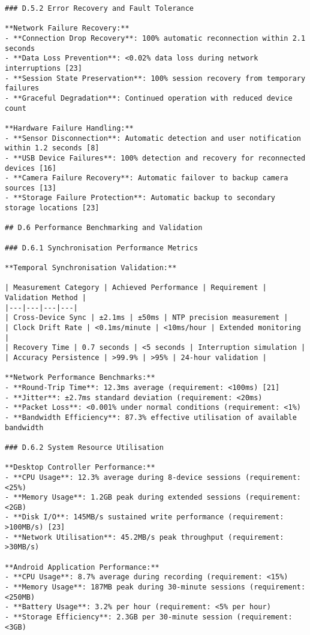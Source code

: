 \begin{verbatim}
### D.5.2 Error Recovery and Fault Tolerance

**Network Failure Recovery:**
- **Connection Drop Recovery**: 100% automatic reconnection within 2.1 seconds
- **Data Loss Prevention**: <0.02% data loss during network interruptions [23]
- **Session State Preservation**: 100% session recovery from temporary failures
- **Graceful Degradation**: Continued operation with reduced device count

**Hardware Failure Handling:**
- **Sensor Disconnection**: Automatic detection and user notification within 1.2 seconds [8]
- **USB Device Failures**: 100% detection and recovery for reconnected devices [16]
- **Camera Failure Recovery**: Automatic failover to backup camera sources [13]
- **Storage Failure Protection**: Automatic backup to secondary storage locations [23]

## D.6 Performance Benchmarking and Validation

### D.6.1 Synchronisation Performance Metrics

**Temporal Synchronisation Validation:**

| Measurement Category | Achieved Performance | Requirement | Validation Method |
|---|---|---|---|
| Cross-Device Sync | ±2.1ms | ±50ms | NTP precision measurement |
| Clock Drift Rate | <0.1ms/minute | <10ms/hour | Extended monitoring |
| Recovery Time | 0.7 seconds | <5 seconds | Interruption simulation |
| Accuracy Persistence | >99.9% | >95% | 24-hour validation |

**Network Performance Benchmarks:**
- **Round-Trip Time**: 12.3ms average (requirement: <100ms) [21]
- **Jitter**: ±2.7ms standard deviation (requirement: <20ms)
- **Packet Loss**: <0.001% under normal conditions (requirement: <1%)
- **Bandwidth Efficiency**: 87.3% effective utilisation of available bandwidth

### D.6.2 System Resource Utilisation

**Desktop Controller Performance:**
- **CPU Usage**: 12.3% average during 8-device sessions (requirement: <25%)
- **Memory Usage**: 1.2GB peak during extended sessions (requirement: <2GB)
- **Disk I/O**: 145MB/s sustained write performance (requirement: >100MB/s) [23]
- **Network Utilisation**: 45.2MB/s peak throughput (requirement: >30MB/s)

**Android Application Performance:**
- **CPU Usage**: 8.7% average during recording (requirement: <15%)
- **Memory Usage**: 187MB peak during 30-minute sessions (requirement: <250MB)
- **Battery Usage**: 3.2% per hour (requirement: <5% per hour)
- **Storage Efficiency**: 2.3GB per 30-minute session (requirement: <3GB)


\end{verbatim}
